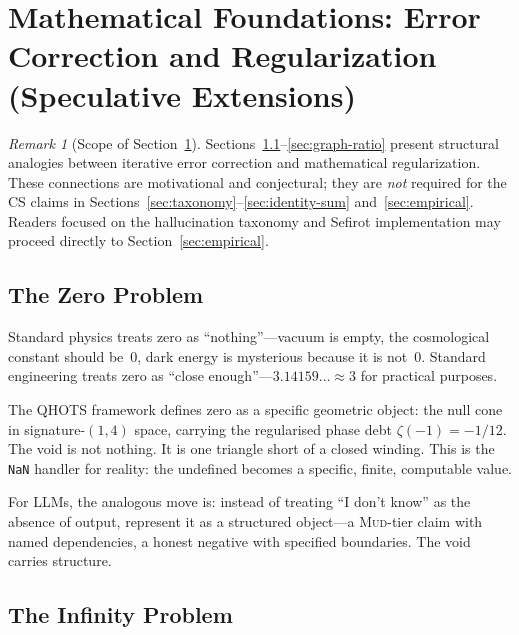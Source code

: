 \documentclass[11pt]{article}
\theoremstyle{definition}
\theoremstyle{remark}
\newtheorem{remark}[theorem]{Remark}
\newcommand{\NaN}{\texttt{NaN}}
\newcommand{\MUD}{\textsc{Mud}}
\begin{document}
\section{Mathematical Foundations: Error Correction and Regularization
  (Speculative Extensions)}
\label{sec:math-foundations}

\begin{remark}[Scope of Section~\ref{sec:math-foundations}]
Sections~\ref{sec:zero-problem}--\ref{sec:graph-ratio} present structural
analogies between iterative error correction and mathematical regularization.
These connections are motivational and conjectural; they are \emph{not} required
for the CS claims in Sections~\ref{sec:taxonomy}--\ref{sec:identity-sum}
and~\ref{sec:empirical}.  Readers focused on the hallucination taxonomy and
Sefirot implementation may proceed directly to
Section~\ref{sec:empirical}.
\end{remark}

\subsection{The Zero Problem}
\label{sec:zero-problem}

Standard physics treats zero as ``nothing''---vacuum is empty, the cosmological
constant should be~0, dark energy is mysterious because it is not~0.  Standard
engineering treats zero as ``close enough''---$3.14159\ldots \approx 3$ for
practical purposes.

The QHOTS framework defines zero as a specific geometric object: the null cone
in signature-$(1,4)$ space, carrying the regularised phase debt
$\zeta(-1) = -1/12$.  The void is not nothing.  It is one triangle short of a
closed winding.  This is the \NaN{} handler for reality: the undefined becomes a
specific, finite, computable value.

For LLMs, the analogous move is: instead of treating ``I don't know'' as the
absence of output, represent it as a structured object---a \MUD-tier claim with
named dependencies, a honest negative with specified boundaries.  The void
carries structure.

\subsection{The Infinity Problem}
\label{sec:infinity-problem}
\end{document}
